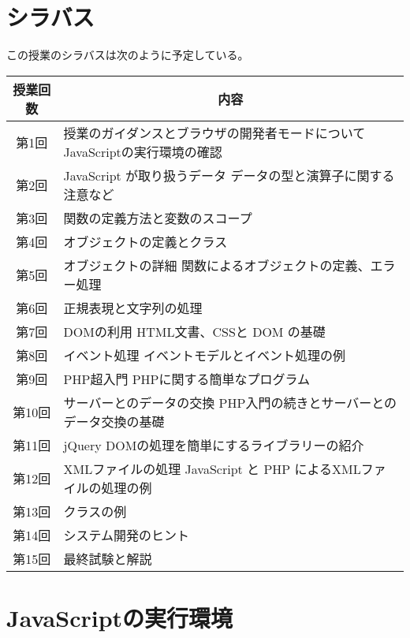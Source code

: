 \section{シラバス}
この授業のシラバスは次のように予定している。
\begin{center}
\begin{tabular}{|c|m{}|}\hline
 授業回数&\multicolumn{1}{c|}{内容}\\\hline
 第1回&授業のガイダンスとブラウザの開発者モードについて \newline
     JavaScriptの実行環境の確認\\\hline
 第2回&JavaScript が取り扱うデータ\newline
     データの型と演算子に関する注意など\\\hline
 第3回& 関数の定義方法と変数のスコープ\\\hline
 第4回& オブジェクトの定義とクラス\\\hline
 第5回&オブジェクトの詳細\newline
     関数によるオブジェクトの定義、エラー処理\\\hline
 第6回&正規表現と文字列の処理  \\\hline
 第7回&DOMの利用\newline
     HTML文書、CSSと DOM の基礎\\\hline
 第8回&イベント処理 \newline
     イベントモデルとイベント処理の例\\\hline
 第9回&PHP超入門\newline
       PHPに関する簡単なプログラム\\\hline
 第10回&サーバーとのデータの交換\newline
     PHP入門の続きとサーバーとのデータ交換の基礎\\\hline
 第11回&jQuery \newline
     DOMの処理を簡単にするライブラリーの紹介\\   \hline
 第12回&XMLファイルの処理\newline
     JavaScript と PHP によるXMLファイルの処理の例\\\hline
 第13回&クラスの例\\\hline
 第14回&システム開発のヒント\\\hline
 第15回&最終試験と解説\\ \hline
\end{tabular}
\end{center}
\section{JavaScriptの実行環境}

